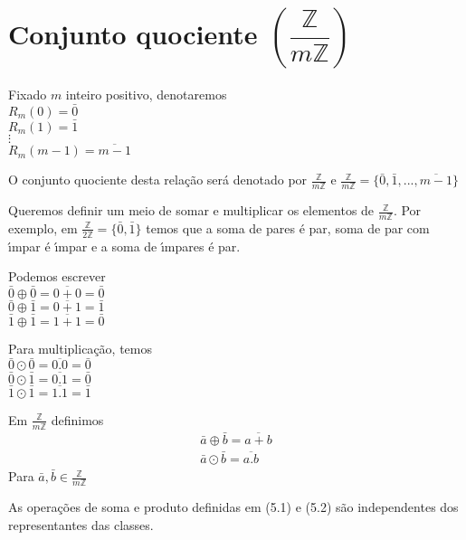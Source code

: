 \section{Conjunto quociente $\left(\dfrac{\mathbb{Z}}{m\mathbb{Z}}\right)$}


\begin{nota} Fixado $m$ inteiro positivo, denotaremos\\
$R_{m}(0)=\bar{0}$\\
$R_{m}(1)=\bar{1}$\\
$\vdots$\\
$R_{m}(m-1)=\overline{m-1}$

O conjunto quociente desta rela{\c c}{\~a}o ser{\'a} denotado por $\displaystyle\frac{\mathbb{Z}}{m\mathbb{Z}}$ e $\displaystyle\frac{\mathbb{Z}}{m\mathbb{Z}}=\{\bar{0},\bar{1},...,\overline{m-1}\}$
\end{nota}

Queremos definir um meio de somar e multiplicar os elementos de $\displaystyle\frac{\mathbb{Z}}{m\mathbb{Z}}$. Por exemplo, em $\displaystyle\frac{\mathbb{Z}}{2\mathbb{Z}}=\{\bar{0},\bar{1}\}$ temos que a soma de pares {\'e} par, soma de par com {\'\i}mpar {\'e} {\'\i}mpar e a soma de {\'\i}mpares {\'e} par.

Podemos escrever
\vspace{0,05cm}\\
$\bar{0}\oplus\bar{0}=\overline{0+0}=\bar{0}$\\
$\bar{0}\oplus\bar{1}=\overline{0+1}=\bar{1}$\\
$\bar{1}\oplus\bar{1}=\overline{1+1}=\bar{0}$

Para multiplica{\c c}{\~a}o, temos
\vspace{0,05cm}\\
$\bar{0}\odot\bar{0}=\overline{0.0}=\bar{0}$\\
$\bar{0}\odot\bar{1}=\overline{0.1}=\bar{0}$\\
$\bar{1}\odot\bar{1}=\overline{1.1}=\bar{1}$

Em $\displaystyle\frac{\mathbb{Z}}{m\mathbb{Z}}$ definimos
\begin{eqnarray}
\bar{a}\oplus\bar{b}=\overline{a+b}\\
\bar{a}\odot\bar{b}=\overline{a.b}
\end{eqnarray}
Para $\bar{a},\bar{b}\in\displaystyle\frac{\mathbb{Z}}{m\mathbb{Z}}$

\begin{proposicao} As opera{\c c}{\~o}es de soma e produto definidas em (5.1) e (5.2) s{\~a}o independentes dos representantes das classes.\end{proposicao}

